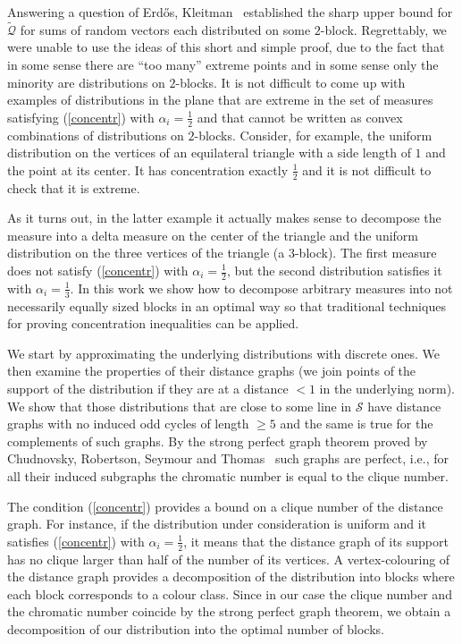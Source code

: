 \documentclass{article}
\newcommand{\concdiam}{\tilde{\mathcal{Q}}}
\begin{document}
Answering a question of Erd\H{o}s, Kleitman~\cite{Kleitman} established the sharp upper bound for $\concdiam$ for sums of random vectors each distributed on some $2$-block. Regrettably, we were unable to use the ideas of this short and simple proof, due to the fact that in some sense there are ``too many'' extreme  points and in some sense only the minority are distributions on $2$-blocks. It is not difficult to come up with examples of distributions in the 
plane
that are extreme in the set of measures satisfying (\ref{concentr}) with $\alpha_i=\frac{1}{2}$ and that cannot be written as convex combinations of distributions on $2$-blocks. Consider, for example, the uniform distribution on the vertices of an equilateral triangle with a side length of $1$ and the point at its center. It has concentration exactly $\frac{1}{2}$ and it is not difficult to check that it is extreme.

As it turns out, in the latter example it actually makes sense to decompose the measure into a delta measure on the center of the triangle and the uniform distribution on the three vertices of the triangle (a $3$-block). The first measure does not satisfy (\ref{concentr}) with $\alpha_i=\frac{1}{2}$, but the second distribution satisfies it with $\alpha_i=\frac{1}{3}$. In this work we show
how to decompose arbitrary measures into not necessarily equally sized blocks in an optimal way
so that traditional techniques for proving concentration inequalities can be applied.


We start by approximating the underlying distributions with discrete ones. We then examine the properties of their distance graphs (we join points of the support of the distribution if they are at a distance $<1$ in the underlying norm). We show that those distributions that are close to some line in $\mathcal{S}$ have distance graphs with no induced odd cycles of length $\geq 5$ and the same is true for the complements of such graphs. By the strong perfect graph theorem proved by Chudnovsky, Robertson, Seymour and Thomas~\cite{strong_perfect} such graphs are perfect, i.e., for all their induced subgraphs the chromatic number is equal to the clique number. 

The condition
(\ref{concentr}) provides a bound on a clique number of the distance graph. For instance, if the distribution under consideration is uniform and it satisfies (\ref{concentr}) with $\alpha_i=\frac{1}{2}$, it means that the distance graph of its support has no clique larger than half of the number of its vertices. A vertex-colouring of the distance graph provides a decomposition of the distribution into blocks where each block corresponds to a colour class. Since in our case the clique number and the chromatic number coincide by the strong perfect graph theorem, we obtain a decomposition of our distribution into the optimal number of blocks. 
\end{document}
